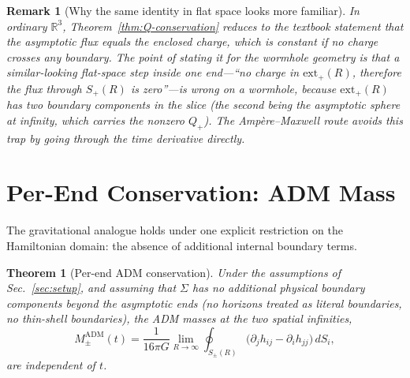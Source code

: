 \documentclass[aps,prd,onecolumn,nofootinbib,superscriptaddress]{revtex4-2}
\newtheorem{theorem}{Theorem}
\newtheorem{remark}{Remark}
\begin{document}
\begin{remark}[Why the same identity in flat space looks more familiar]
In ordinary $\mathbb{R}^3$, Theorem~\ref{thm:Q-conservation} reduces to the textbook statement that the asymptotic flux equals the enclosed charge, which is constant if no charge crosses any boundary. The point of stating it for the wormhole geometry is that a similar-looking flat-space step inside one end---``no charge in $\mathrm{ext}_+(R)$, therefore the flux through $S_+(R)$ is zero''---is wrong on a wormhole, because $\mathrm{ext}_+(R)$ has \emph{two} boundary components in the slice (the second being the asymptotic sphere at infinity, which carries the nonzero $Q_+$). The Amp\`ere--Maxwell route avoids this trap by going through the time derivative directly.
\end{remark}

\section{Per-End Conservation: ADM Mass}
\label{sec:adm}

The gravitational analogue holds under one explicit restriction on the Hamiltonian domain: the absence of additional internal boundary terms.

\begin{theorem}[Per-end ADM conservation]
\label{thm:M-conservation}
Under the assumptions of Sec.~\ref{sec:setup}, and assuming that $\Sigma$ has no additional physical boundary components beyond the asymptotic ends (no horizons treated as literal boundaries, no thin-shell boundaries), the ADM masses at the two spatial infinities,
\begin{equation}
M_\pm^{\mathrm{ADM}}(t) = \frac{1}{16\pi G}\lim_{R\to\infty}\oint_{S_\pm(R)} \big(\partial_j h_{ij}-\partial_i h_{jj}\big)\,dS_i,
\end{equation}
are independent of $t$.
\end{theorem}
\end{document}
